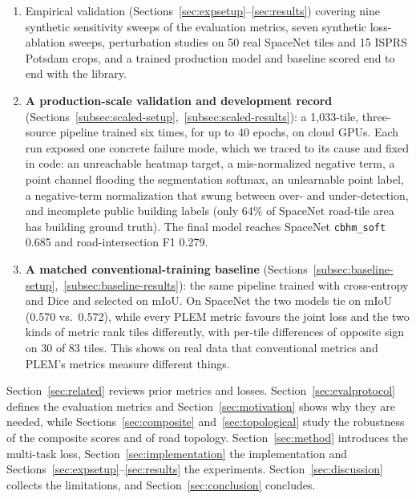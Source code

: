 \begin{enumerate}
    matches instances with the Hungarian algorithm rather than greedy nearest-neighbor
    assignment, which avoids a specific adversarial failure mode. We apply it to road
    intersections derived from the vector road labels (Section~\ref{subsec:scaled-setup}), so
    point and road ground truth come from one annotation of the same image and cannot disagree.
  \item Empirical validation (Sections~\ref{sec:expsetup}--\ref{sec:results}) covering nine
    synthetic sensitivity sweeps of the evaluation metrics, seven synthetic loss-ablation sweeps,
    perturbation studies on 50 real SpaceNet tiles and 15 ISPRS Potsdam crops, and a trained
    production model and baseline scored end to end with the library.
  \item \textbf{A production-scale validation and development record}
    (Sections~\ref{subsec:scaled-setup},~\ref{subsec:scaled-results}): a 1,033-tile, three-source
    pipeline trained six times, for up to 40 epochs, on cloud GPUs. Each run exposed one concrete failure
    mode, which we traced to its cause and fixed in code: an unreachable heatmap target, a
    mis-normalized negative term, a point channel flooding the segmentation softmax, an
    unlearnable point label, a negative-term normalization that swung between over- and
    under-detection, and incomplete public building labels (only 64\% of SpaceNet road-tile area
    has building ground truth). The final model reaches SpaceNet \texttt{cbhm\_soft} 0.685 and
    road-intersection F1 0.279.
  \item \textbf{A matched conventional-training baseline}
    (Sections~\ref{subsec:baseline-setup},~\ref{subsec:baseline-results}): the same pipeline
    trained with cross-entropy and Dice and selected on mIoU. On SpaceNet the two models tie on
    mIoU (0.570 vs.\ 0.572), while every PLEM metric favours the joint loss and the two kinds of
    metric rank tiles differently, with per-tile differences of opposite sign on 30 of 83 tiles.
    This shows on real data that conventional metrics and PLEM's metrics measure different
    things.
\end{enumerate}

Section~\ref{sec:related} reviews prior metrics and losses. Section~\ref{sec:evalprotocol} defines
the evaluation metrics and Section~\ref{sec:motivation} shows why they are needed, while
Sections~\ref{sec:composite} and~\ref{sec:topological} study the robustness of the composite scores
and of road topology. Section~\ref{sec:method} introduces the multi-task loss,
Section~\ref{sec:implementation} the implementation and
Sections~\ref{sec:expsetup}--\ref{sec:results} the experiments. Section~\ref{sec:discussion}
collects the limitations, and Section~\ref{sec:conclusion} concludes.

